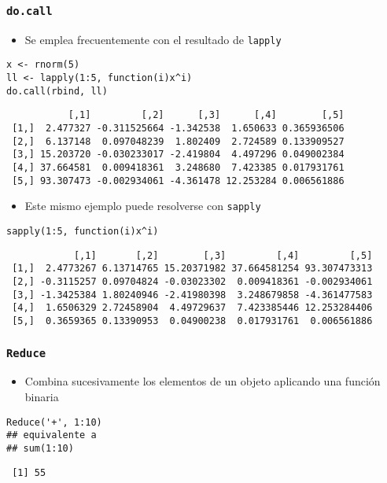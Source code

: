 \documentclass[xcolor={usenames,svgnames,dvipsnames}]{beamer}
\begin{document}
\begin{frame}[fragile]
\frametitle{\texttt{do.call}}
\label{sec-4-2}


\begin{itemize}
\item Se emplea frecuentemente con el resultado de \texttt{lapply}
\end{itemize}

\lstset{language=R}
\begin{lstlisting}
x <- rnorm(5)
ll <- lapply(1:5, function(i)x^i)
do.call(rbind, ll)
\end{lstlisting}

\begin{verbatim}
           [,1]         [,2]      [,3]      [,4]        [,5]
 [1,]  2.477327 -0.311525664 -1.342538  1.650633 0.365936506
 [2,]  6.137148  0.097048239  1.802409  2.724589 0.133909527
 [3,] 15.203720 -0.030233017 -2.419804  4.497296 0.049002384
 [4,] 37.664581  0.009418361  3.248680  7.423385 0.017931761
 [5,] 93.307473 -0.002934061 -4.361478 12.253284 0.006561886
\end{verbatim}

\begin{itemize}
\item Este mismo ejemplo puede resolverse con \texttt{sapply}
\end{itemize}

\lstset{language=R}
\begin{lstlisting}
sapply(1:5, function(i)x^i)
\end{lstlisting}

\begin{verbatim}
            [,1]       [,2]        [,3]         [,4]         [,5]
 [1,]  2.4773267 6.13714765 15.20371982 37.664581254 93.307473313
 [2,] -0.3115257 0.09704824 -0.03023302  0.009418361 -0.002934061
 [3,] -1.3425384 1.80240946 -2.41980398  3.248679858 -4.361477583
 [4,]  1.6506329 2.72458904  4.49729637  7.423385446 12.253284406
 [5,]  0.3659365 0.13390953  0.04900238  0.017931761  0.006561886
\end{verbatim}
\end{frame}
\begin{frame}[fragile]
\frametitle{\texttt{Reduce}}
\label{sec-4-3}

\begin{itemize}
\item Combina sucesivamente los elementos de un objeto aplicando una
  función binaria
\end{itemize}

\lstset{language=R}
\begin{lstlisting}
Reduce('+', 1:10)
## equivalente a 
## sum(1:10)
\end{lstlisting}

\begin{verbatim}
 [1] 55
\end{verbatim}
\end{frame}
\end{document}
